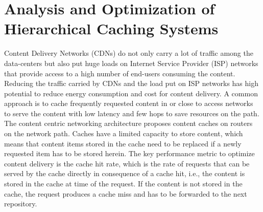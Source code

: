 \chapter{Analysis and Optimization of Hierarchical Caching Systems}\label{chap:hierarchical}

Content Delivery Networks (CDNs) do not only carry a lot of traffic among the data-centers but also put huge loads on Internet Service Provider (ISP) networks that provide access to a high number of end-users consuming the content.
Reducing the traffic carried by CDNs and the load put on ISP networks has high potential to reduce energy consumption and cost for content delivery.
A common approach is to cache frequently requested content in or close to access networks to serve the content with low latency and few hops to save resources on the path.
The content centric networking architecture proposes content caches on routers on the network path.
Caches have a limited capacity to store content, which means that content items stored in the cache need to be replaced if a newly requested item has to be stored herein.
The key performance metric to optimize content delivery is the cache hit rate, which is the rate of requests that can be served by the cache directly in consequence of a cache hit, i.e., the content is stored in the cache at time of the request.
If the content is not stored in the cache, the request produces a cache miss and has to be forwarded to the next repository.

